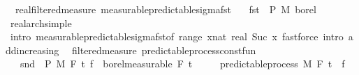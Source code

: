 \begin{isabellebody}
\endisatagproof
{\isafoldproof}%
%
\isadelimproof
\isanewline
%
\endisadelimproof
\isanewline
{}\isamarkupfalse%
\ {\isacharparenleft}{\kern0pt}\ real{\isacharunderscore}{\kern0pt}filtered{\isacharunderscore}{\kern0pt}measure{\isacharparenright}{\kern0pt}\ measurable{\isacharunderscore}{\kern0pt}predictable{\isacharunderscore}{\kern0pt}sigma{\isacharunderscore}{\kern0pt}fst{\isacharcolon}{\kern0pt}\isanewline
\ \ \ {\isachardoublequoteopen}fst\ {\isasymin}\ {\isasymSigma}\isactrlsub P\ {\isasymrightarrow}\isactrlsub M\ borel{\isachardoublequoteclose}\isanewline
%
\isadelimproof
\ \ %
\endisadelimproof
%
\isatagproof
{}\isamarkupfalse%
\ real{\isacharunderscore}{\kern0pt}arch{\isacharunderscore}{\kern0pt}simple\ \isamarkupfalse%
\ {\isacharparenleft}{\kern0pt}intro\ measurable{\isacharunderscore}{\kern0pt}predictable{\isacharunderscore}{\kern0pt}sigma{\isacharunderscore}{\kern0pt}fst{\isacharbrackleft}{\kern0pt}of\ {\isachardoublequoteopen}range\ {\isacharparenleft}{\kern0pt}{\isasymlambda}x{\isacharcolon}{\kern0pt}{\isacharcolon}{\kern0pt}nat{\isachardot}{\kern0pt}\ {\isacharbraceleft}{\kern0pt}{}{\isacharless}{\kern0pt}{\isachardot}{\kern0pt}{\isachardot}{\kern0pt}real\ {\isacharparenleft}{\kern0pt}Suc\ x{\isacharparenright}{\kern0pt}{\isacharbraceright}{\kern0pt}{\isacharparenright}{\kern0pt}{\isachardoublequoteclose}{\isacharbrackright}{\kern0pt}{\isacharparenright}{\kern0pt}\ {\isacharparenleft}{\kern0pt}fastforce\ intro{\isacharcolon}{\kern0pt}\ add{\isacharunderscore}{\kern0pt}increasing{\isacharparenright}{\kern0pt}{\isacharplus}{\kern0pt}%
\endisatagproof
{\isafoldproof}%
%
\isadelimproof
\isanewline
%
\endisadelimproof
\isanewline
\isanewline
\isanewline
{}\isamarkupfalse%
\ {\isacharparenleft}{\kern0pt}\ filtered{\isacharunderscore}{\kern0pt}measure{\isacharparenright}{\kern0pt}\ predictable{\isacharunderscore}{\kern0pt}process{\isacharunderscore}{\kern0pt}const{\isacharunderscore}{\kern0pt}fun{\isacharcolon}{\kern0pt}\isanewline
\ \ \ {\isachardoublequoteopen}snd\ {\isasymin}\ {\isasymSigma}\isactrlsub P\ {\isasymrightarrow}\isactrlsub M\ F\ t\ {\isachardoublequoteopen}f\ {\isasymin}\ borel{\isacharunderscore}{\kern0pt}measurable\ {\isacharparenleft}{\kern0pt}F\ t\isanewline
\ \ \ \ \ {\isachardoublequoteopen}predictable{\isacharunderscore}{\kern0pt}process\ M\ F\ t\ {\isacharparenleft}{\kern0pt}{\isasymlambda}{\isacharunderscore}{\kern0pt}{\isachardot}{\kern0pt}\ f{\isacharparenright}{\kern0pt}{\isachardoublequoteclose}\isanewline

\end{isabellebody}
